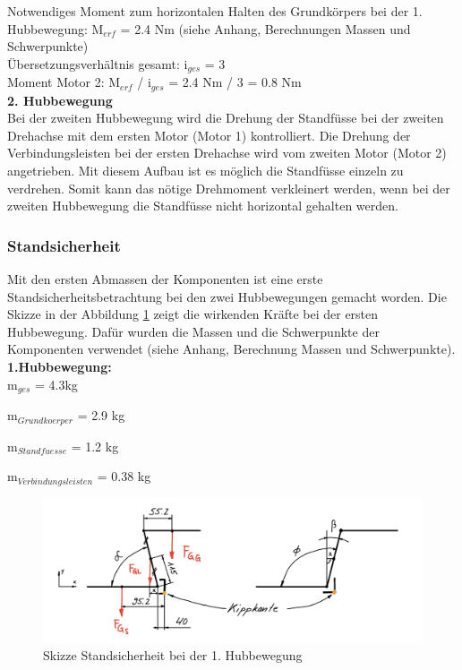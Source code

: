 Notwendiges Moment zum horizontalen Halten des Grundkörpers bei der 1. Hubbewegung: M$_{erf}$ = 2.4 Nm (siehe Anhang, Berechnungen Massen und Schwerpunkte)\\

Übersetzungsverhältnis gesamt: i$_{ges}$ = 3\\

Moment Motor 2: M$_{erf}$ / i$_{ges}$ = 2.4 Nm / 3 = 0.8 Nm\\

\textbf{2. Hubbewegung}\\
Bei der zweiten Hubbewegung wird die Drehung der Standfüsse bei der zweiten Drehachse mit dem ersten Motor (Motor 1) kontrolliert. Die Drehung der Verbindungsleisten bei der ersten Drehachse wird vom zweiten Motor (Motor 2) angetrieben. Mit diesem Aufbau ist es möglich die Standfüsse einzeln zu verdrehen. Somit kann das nötige Drehmoment verkleinert werden, wenn bei der zweiten Hubbewegung die Standfüsse nicht horizontal gehalten werden.



\newpage


\subsubsection{Standsicherheit}
Mit den ersten Abmassen der Komponenten ist eine erste Standsicherheitsbetrachtung bei den zwei Hubbewegungen gemacht worden. Die Skizze in der Abbildung \ref{fig:standsicherheit-1-hubbewegung} zeigt die wirkenden Kräfte bei der ersten Hubbewegung. Dafür wurden die Massen und die Schwerpunkte der Komponenten verwendet (siehe Anhang, Berechnung Massen und Schwerpunkte).\\

\textbf{1.Hubbewegung:}\\

m$_{ges}$ = 4.3kg

m$_{Grundkoerper}$ = 2.9 kg

m$_{Standfuesse}$ = 1.2 kg

m$_{Verbindungsleisten}$ = 0.38 kg\\

\begin{figure}[H]
  \includegraphics[width=1\textwidth]{img/Treppensteigen/Standsicherheit 1.Hub.png}
  \centering
  \caption{Skizze Standsicherheit bei der 1. Hubbewegung}
  \label{fig:standsicherheit-1-hubbewegung}
\end{figure}

